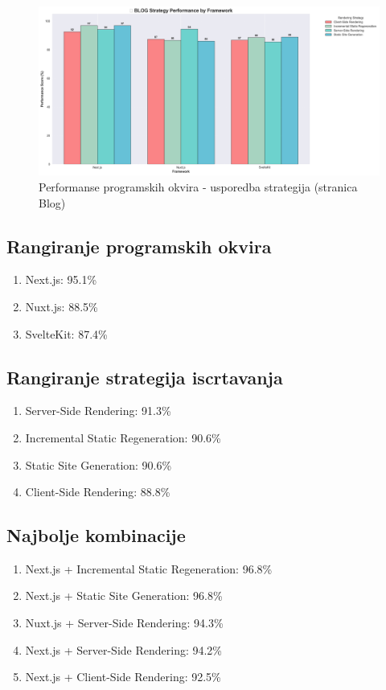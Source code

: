 \begin{figure}[H]
    \centering
    \includegraphics[width=\textwidth]{slike/rezultati/blog/blog_strategy_comparison.png}
    \caption{Performanse programskih okvira - usporedba strategija (stranica Blog)}
    \label{fig:testiranje-blog-usporedba-strategija}
\end{figure}

\newpage

\subsection{Rangiranje programskih okvira}
\begin{enumerate}
    \item Next.js: 95.1\%
    \item Nuxt.js: 88.5\%
    \item SvelteKit: 87.4\%
\end{enumerate}

\subsection{Rangiranje strategija iscrtavanja}
\begin{enumerate}
    \item Server-Side Rendering: 91.3\%
    \item Incremental Static Regeneration: 90.6\%
    \item Static Site Generation: 90.6\%
    \item Client-Side Rendering: 88.8\%
\end{enumerate}

\subsection{Najbolje kombinacije}
\begin{enumerate}
    \item Next.js + Incremental Static Regeneration: 96.8\%
    \item Next.js + Static Site Generation: 96.8\%
    \item Nuxt.js + Server-Side Rendering: 94.3\%
    \item Next.js + Server-Side Rendering: 94.2\%
    \item Next.js + Client-Side Rendering: 92.5\%
\end{enumerate}

